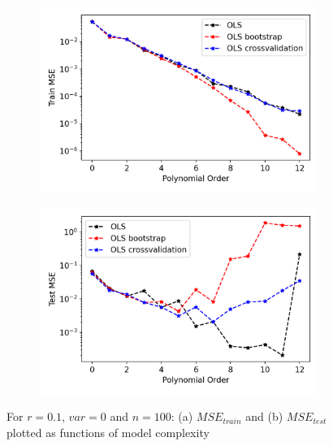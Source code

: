 \begin{figure}[h!]
\centering
\begin{subfigure}{.5\textwidth}
  \centering
  \includegraphics[width=.8\linewidth]{Images/ols15.png}
  \caption{}
  \label{fig:ols15}
\end{subfigure}%
\begin{subfigure}{.5\textwidth}
  \centering
  \includegraphics[width=.8\linewidth]{Images/ols14.png}
  \caption{}
  \label{fig:ols14}
\end{subfigure}
\caption{For $r=0.1$, $var=0$ and $n=100$: (a) $MSE_{train}$ and (b) $MSE_{test}$ plotted as functions of model complexity}
\label{fig:OLS_resample2}
\end{figure}

